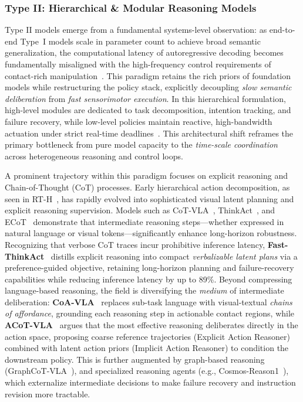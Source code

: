 \documentclass[acmsmall,screen,review,anonymous]{acmart}
\begin{document}
\subsubsection{Type II\@: Hierarchical \& Modular Reasoning Models}

Type II models emerge from a fundamental systems-level observation: as end-to-end Type~I models scale in parameter count to achieve broad semantic generalization, the computational latency of autoregressive decoding becomes fundamentally misaligned with the high-frequency control requirements of contact-rich manipulation~\cite{belkhale2024rth,chen2025fis,xu2025a0}. This paradigm retains the rich priors of foundation models while restructuring the policy stack, explicitly decoupling \emph{slow semantic deliberation} from \emph{fast sensorimotor execution}. In this hierarchical formulation, high-level modules are dedicated to task decomposition, intention tracking, and failure recovery, while low-level policies maintain reactive, high-bandwidth actuation under strict real-time deadlines~\cite{zhao2025cotvla,huang2025thinkact,zhang2025robridge}. This architectural shift reframes the primary bottleneck from pure model capacity to the \emph{time-scale coordination} across heterogeneous reasoning and control loops.

A prominent trajectory within this paradigm focuses on explicit reasoning and Chain-of-Thought (CoT) processes. Early hierarchical action decomposition, as seen in RT-H~\cite{belkhale2024rth}, has rapidly evolved into sophisticated visual latent planning and explicit reasoning supervision. Models such as CoT-VLA~\cite{zhao2025cotvla}, ThinkAct~\cite{huang2025thinkact}, and ECoT~\cite{zawalski2025ecot} demonstrate that intermediate reasoning steps---whether expressed in natural language or visual tokens---significantly enhance long-horizon robustness. Recognizing that verbose CoT traces incur prohibitive inference latency, \textbf{Fast-ThinkAct}~\cite{huang2026fastthinkact} distills explicit reasoning into compact \emph{verbalizable latent plans} via a preference-guided objective, retaining long-horizon planning and failure-recovery capabilities while reducing inference latency by up to 89\%. Beyond compressing language-based reasoning, the field is diversifying the \emph{medium} of intermediate deliberation: \textbf{CoA-VLA}~\cite{li2025coavla} replaces sub-task language with visual-textual \emph{chains of affordance}, grounding each reasoning step in actionable contact regions, while \textbf{ACoT-VLA}~\cite{zhong2026acotvla} argues that the most effective reasoning deliberates directly in the action space, proposing coarse reference trajectories (Explicit Action Reasoner) combined with latent action priors (Implicit Action Reasoner) to condition the downstream policy. This is further augmented by graph-based reasoning (GraphCoT-VLA~\cite{jin2024graphcot}), and specialized reasoning agents (e.g., Cosmos-Reason1~\cite{cosmosreason2024}), which externalize intermediate decisions to make failure recovery and instruction revision more tractable.
\end{document}
